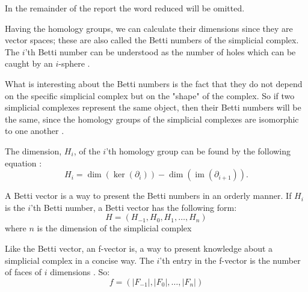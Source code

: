 \documentclass[11pt,a4paper,twoside]{report}
\DeclareMathOperator{\im}{im}
\begin{document}
In the remainder of the report the word reduced will be omitted.

Having the homology groups, we can calculate their dimensions since they are vector spaces; these are also called the Betti numbers of the simplicial complex. The $i$'th Betti number can be understood as the number of holes which can be caught by an $i$-sphere \cite{wikiBetti}.

What is interesting about the Betti numbers is the fact that they do not depend on the  specific simplicial complex but on the "shape" of the complex. So if two simplicial complexes represent the same object, then their Betti numbers will be the same, since the homology groups of the simplicial complexes are isomorphic to one another \cite[p. 70]{Edelsbrunner}. 

The dimension, $H_i$, of the $i$'th homology group can be found by the following equation \cite[p.2]{Allgaier}:
\begin{equation}\label{eq:homology_group}
H_i = \dim(\ker(\partial_i))-\dim(\im(\partial_{i+1})).
\end{equation}

A Betti vector is a way to present the Betti numbers in an orderly manner. If $H_i$ is the $i$'th Betti number, a Betti vector has the following form:
\begin{equation*}
H = (H_{-1},H_0,H_1,\dots,H_n)
\end{equation*}
where $n$ is the dimension of the simplicial complex

Like the Betti vector, an f-vector is, a way to present knowledge about a simplicial complex in a concise way. The $i$'th entry in the f-vector is the number of faces of $i$ dimensions \cite[p.15]{Jonsson}. So:
\begin{equation*}
f = (|F_{-1}|,|F_0|,\dots,|F_n|)
\end{equation*}
\end{document}
